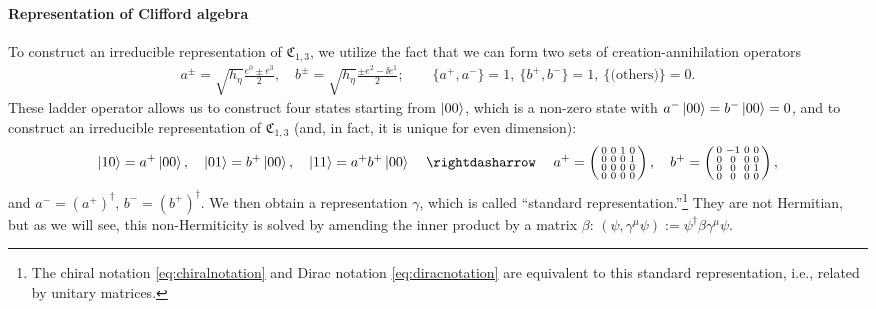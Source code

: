 \documentclass[CheatSheet]{subfiles}
\begin{document}
\paragraph{Representation of Clifford algebra}
To construct an irreducible representation of $\mathfrak C_{1,3}$, we utilize the fact that we can form two sets of creation-annihilation operators
\begin{align}
 a^\pm = \sqrt{h_\eta}\frac{e^0\pm e^3}{2},\quad
 b^\pm = \sqrt{h_\eta}\frac{\pm e^2-\ii e^1}{2};\qquad
 \{a^+,a^-\}=1,~
 \{b^+,b^-\}=1,~
 \{\text{(others)}\} = 0.
\end{align}
These ladder operator allows us to construct four states starting from $\ket{00}$, which is a non-zero state with $a^-\ket{00}=b^-\ket{00}=0$, and to construct an irreducible representation of $\mathfrak C_{1,3}$ (and, in fact, it is unique for even dimension):
\begin{equation}
 \ket{10} = a^+\ket{00},\quad
 \ket{01} = b^+\ket{00},\quad
 \ket{11} = a^+b^+\ket{00}\quad\leadsto\quad
 a^+=\spmat{0&0&1&0\\0&0&0&1\\0&0&0&0\\0&0&0&0},\quad
 b^+=\spmat{0&-1&0&0\\0&0&0&0\\0&0&0&1\\0&0&0&0},
\end{equation}
and $a^-=(a^+)^\dagger$, $b^-=(b^+)^\dagger$.
We then obtain a representation $\gamma$, which is called ``standard representation.''\footnote{The chiral notation \eqref{eq:chiralnotation} and Dirac notation \eqref{eq:diracnotation} are equivalent to this standard representation, i.e., related by unitary matrices.}
They are not Hermitian, but as we will see, this non-Hermiticity is solved by amending the inner product by a matrix $\beta$: $(\psi,\gamma^\mu\psi):=\psi^\dagger\beta \gamma^\mu\psi$.
\end{document}
